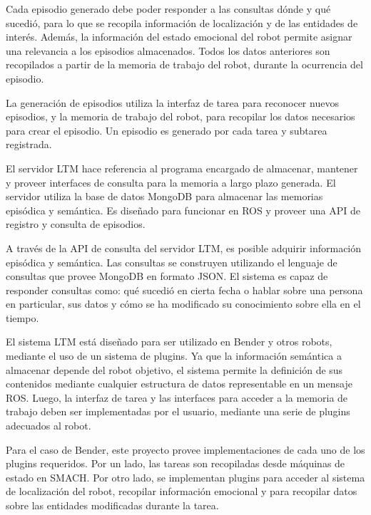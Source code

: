 Cada episodio generado debe poder responder a las consultas dónde y qué sucedió, para lo que se recopila información de localización y de las entidades de interés. Además, la información del estado emocional del robot permite asignar una relevancia a los episodios almacenados.  Todos los datos anteriores son recopilados a partir de la memoria de trabajo del robot, durante la ocurrencia del episodio.

La generación de episodios utiliza la interfaz de tarea para reconocer nuevos episodios, y la memoria de trabajo del robot, para recopilar los datos necesarios para crear el episodio. Un episodio es generado por cada tarea y subtarea registrada.

El servidor LTM hace referencia al programa encargado de almacenar, mantener y proveer interfaces de consulta para la memoria a largo plazo generada. El servidor utiliza la base de datos MongoDB para almacenar las memorias episódica y semántica. Es diseñado para funcionar en ROS y proveer una API de registro y consulta de episodios.

A través de la API de consulta del servidor LTM, es posible adquirir información episódica y semántica. Las consultas se construyen utilizando el lenguaje de consultas que provee MongoDB en formato JSON. El sistema es capaz de responder consultas como: qué sucedió en cierta fecha o hablar sobre una persona en particular, sus datos y cómo se ha modificado su conocimiento sobre ella en el tiempo.

El sistema LTM está diseñado para ser utilizado en Bender y otros robots, mediante el uso de un sistema de plugins. Ya que la información semántica a almacenar depende del robot objetivo, el sistema permite la definición de sus contenidos mediante cualquier estructura de datos representable en un mensaje ROS. Luego, la interfaz de tarea y las interfaces para acceder a la memoria de trabajo deben ser implementadas por el usuario, mediante una serie de plugins adecuados al robot. 

Para el caso de Bender, este proyecto provee implementaciones de cada uno de los plugins requeridos. Por un lado, las tareas son recopiladas desde máquinas de estado en SMACH. Por otro lado, se implementan plugins para acceder al sistema de localización del robot, recopilar información emocional y para recopilar datos sobre las entidades modificadas durante la tarea.




